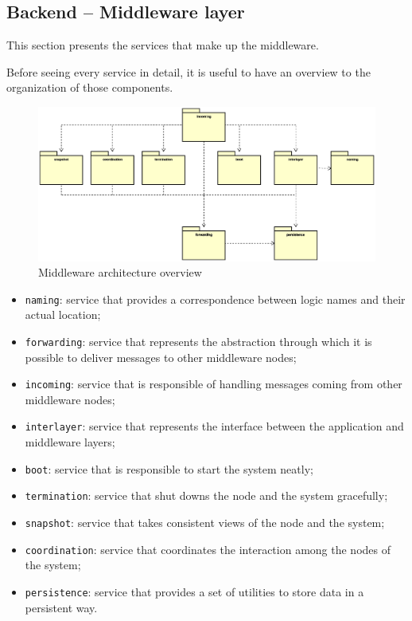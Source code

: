 \subsection{Backend -- Middleware layer}
This section presents the services that make up the middleware.

Before seeing every service in detail, it is useful to have an overview to the
organization of those components.

\begin{figure}[H]
  \centering
  \includegraphics[width=\columnwidth]{images/solution/mw/overview.eps}
  \caption{Middleware architecture overview}
  \label{fig:mw-arch-over}
\end{figure} %

\begin{itemize}
  \item \texttt{naming}: service that provides a correspondence between logic
    names and their actual location;
  \item \texttt{forwarding}: service that represents the abstraction through
    which it is possible to deliver messages to other middleware nodes;
  \item \texttt{incoming}: service that is responsible of handling messages
    coming from other middleware nodes;
  \item \texttt{interlayer}: service that represents the interface between
    the application and middleware layers;
  \item \texttt{boot}: service that is responsible to start the system neatly;
  \item \texttt{termination}: service that shut downs the node and the system
    gracefully;
  \item \texttt{snapshot}: service that takes consistent views of the node and
    the system;
  \item \texttt{coordination}: service that coordinates the interaction among
    the nodes of the system;
  \item \texttt{persistence}: service that provides a set of utilities to
    store data in a persistent way.
\end{itemize}

